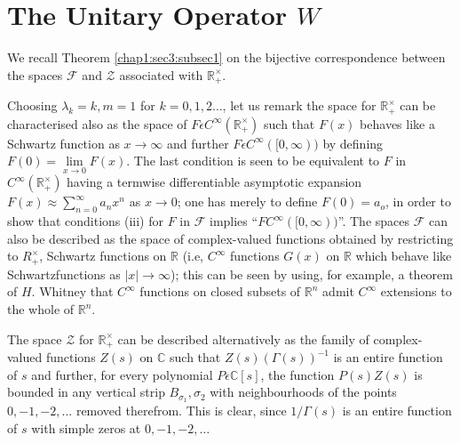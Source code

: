 \setcounter{section}{0}
\section{The Unitary Operator $W$} %

 We recall Theorem \ref{chap1:sec3:subsec1} on the bijective correspondence between the
 spaces $\mathscr{F}$ and $\mathscr{Z}$ associated with
 $\mathbb{R}_{+}^\times$.

 Choosing $\lambda_{k}=k,m=1$ for $k=0,1,2\ldots$, let us remark the
 space for $\mathbb{R}_{+}^\times $ can be characterised also as the
 space of $F\epsilon C^{\infty}(\mathbb{R}_{+}^\times )$ such that
 $F(x)$ behaves like a Schwartz function as $x\rightarrow \infty$ and
 further $F \epsilon C^{\infty}([0,\infty))$ by defining
   $F(0)=\lim\limits_{x \rightarrow 0}F(x)$. The last condition is
   seen to be equivalent to $F$ in $C^{\infty}(\mathbb{R}_{+}^\times )$
   having a termwise differentiable asymptotic expansion
   $F(x)\approx \sum_{n=0}^{\infty}a_{n}x^{n}$ as $x \rightarrow
   0$; one has merely to define $F(0)=a_{o}$, in order to show that
   conditions (iii) for $F$ in $\mathscr{F}$ implies
   ``$FC^{\infty}([0,\infty))$''. The spaces $\mathscr{F}$ can
     also be described as the space of complex-valued functions
     obtained by restricting to $R_{+}^\times $, Schwartz functions on
     $\mathbb{R}$ (i.e, $C^{\infty}$ functions $G(x)$ on $\mathbb{R}$
     which behave like Schwartz\pageoriginale functions as $|x|\rightarrow
     \infty$); this can be seen by using, for example, a theorem of
     $H$. Whitney \cite{Whi} that $C^{\infty}$ functions on closed subsets
     of $\mathbb{R}^{n}$ admit $C^{\infty}$ extensions to the whole of
     $\mathbb{R}^{n}$.
 
 The space $\mathscr{Z}$ for $\mathbb{R}_{+}^\times $ can be described
 alternatively as the family of complex-valued functions $Z(s)$ on
 $\mathbb{C}$ such that $Z(s)(\Gamma(s))^{-1}$ is an entire function of $s$
 and further, for every polynomial $P\epsilon \mathbb{C}[s]$, the
 function $P(s)Z(s)$ is bounded in any vertical strip
 $B_{\sigma_{1}},\sigma_{2}$ with neighbourhoods of the points
 $0,-1,-2,\ldots$ removed therefrom. This is clear, since
 $1/\Gamma(s)$ is an entire function  of $s$ with  simple zeros at
 $0,-1,-2,\ldots$

